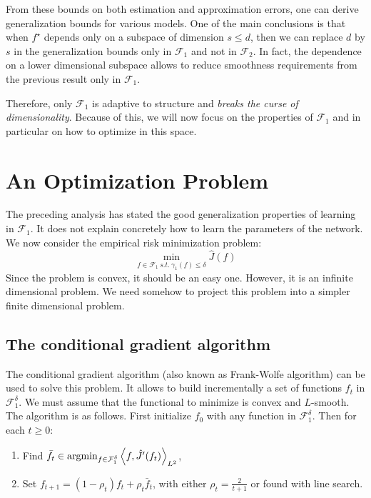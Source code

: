 \documentclass[a4paper, 11pt]{scrartcl}
\begin{document}
{From these bounds on both estimation and approximation errors, one can derive generalization bounds for various models. One of the main conclusions is that when $f^\star$ depends only on a subspace of dimension $s \leq d$, then we can replace $d$ by $s$ in the generalization bounds only in $\mathcal{F}_1$ and not in $\mathcal{F}_2$. In fact, the dependence on a lower dimensional subspace allows to reduce smoothness requirements from the previous result only in $\mathcal{F}_1$.

 Therefore, only $\mathcal{F}_1$ is adaptive to structure and \textit{breaks the curse of dimensionality}. Because of this, we will now focus on the properties of $\mathcal{F}_1$ and in particular on how to optimize in this space.

\section{An Optimization Problem}

The preceding analysis has stated the good generalization properties of learning in $\mathcal{F}_1$. It does not explain concretely how to learn the parameters of the network. We now consider the empirical risk minimization problem:
\begin{equation}
\min_{f\in \mathcal{F}_1~ s.t. ~ \gamma_{1} (f) \leq \delta}  \hat J(f)
\end{equation}
 Since the problem is convex, it should be an easy one. However, it is an infinite dimensional problem. We need somehow to project this problem into a simpler finite dimensional problem.
 
 
\subsection{The conditional gradient algorithm}
 
The conditional gradient algorithm (also known as Frank-Wolfe algorithm) can be used to solve this problem. It allows to build incrementally a set of functions $f_t$ in $\mathcal{F}_1^\delta$. We must assume that the functional to minimize is convex and $L$-smooth.\\

The algorithm is as follows. First initialize $f_0$ with any function in  $\mathcal{F}_1^\delta$. Then for each $t\geq 0$:
\begin{enumerate}
\item Find $\bar f_t \in \textnormal{argmin}_{f \in \mathcal{F}_1^\delta} \left\langle f, \hat J^\prime (f_t) \right\rangle_{L^2}$,
\item Set $f_{t+1} = (1 - \rho_t) f_t + \rho_t \bar f_t$, with either $\rho_t = \frac{2}{t+1}$ or found with line search.
\end{enumerate}

}
\end{document}
